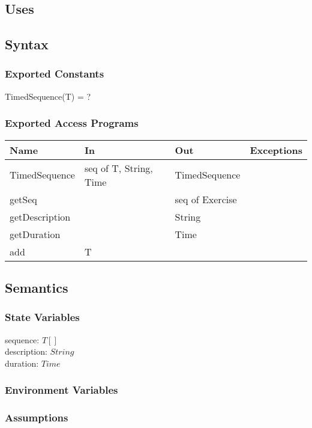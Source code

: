 \documentclass[12pt, titlepage]{article}
\begin{document}
\subsection{Uses}

\subsection{Syntax}

\subsubsection{Exported Constants}
TimedSequence(T) = ?
\subsubsection{Exported Access Programs}

\begin{center}
	\begin{tabular}{p{4cm} p{4cm} p{4cm} p{2cm}}
		\hline
		\textbf{Name} & \textbf{In} & \textbf{Out} & \textbf{Exceptions} \\
		\hline
		TimedSequence & seq of T, String, Time & TimedSequence &  \\
		getSeq &  & seq of Exercise &  \\
		getDescription &  & String &  \\
		getDuration &  & Time &  \\
		add & T & &  \\
		\hline
	\end{tabular}
\end{center}

\subsection{Semantics}

\subsubsection{State Variables}
sequence: $T[]$ \\
description: $String$ \\
duration: $Time$ \\

\subsubsection{Environment Variables}

\subsubsection{Assumptions}
\end{document}
